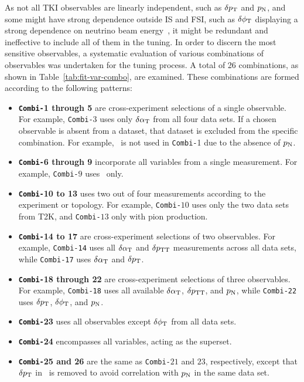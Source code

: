     As not all TKI observables are linearly independent, such as $\delta p_\textrm{T}$ and $p_\textrm{N}$, and some might have strong dependence outside IS and FSI, such as $\delta\phi_\textrm{T}$ displaying a strong dependence on neutrino beam energy~\cite{Lu:2015tcr}, it might be redundant and ineffective to include all of them in the tuning.
    In order to discern the most sensitive observables, a systematic evaluation of various combinations of observables was undertaken for the tuning process. 
    A total of 26 combinations, as shown in Table~\ref{tab:fit-var-combo}, are examined. 
    These combinations are formed according to the following patterns:
    \begin{itemize}
        \item \textbf{\texttt{Combi-}1 through 5} are cross-experiment selections of a single observable. 
        For example, \texttt{Combi-}$3$ uses only $\delta\alpha_\textrm{T}$ from all four data sets. 
        If a chosen observable is absent from a dataset, that dataset is excluded from the specific combination. 
        For example, \ttkzpi\ is not used in \texttt{Combi-}1 due to the absence of $p_\textrm{N}$.
        \item \textbf{\texttt{Combi-}6 through 9} incorporate all variables from a single measurement. For example, \texttt{Combi-}$9$ uses \minpiz\ only.
        \item \textbf{\texttt{Combi-}10 to 13} uses two out of four measurements according to the experiment or topology. For example, \texttt{Combi-}$10$ uses only the two data sets from T2K, and \texttt{Combi-}$13$  only with pion production. 
        \item \textbf{\texttt{Combi-}14 to 17} are cross-experiment selections of two observables. 
        For example, \texttt{Combi-14} uses all $\delta\alpha_\textrm{T}$ and $\delta p_\textrm{TT}$ measurements across all data sets, while \texttt{Combi-17} uses $\delta\alpha_\textrm{T}$ and $\delta p_\textrm{T}$.
        \item \textbf{\texttt{Combi-}18 through 22} are cross-experiment selections of three observables. 
        For example, \texttt{Combi-18} uses all available $\delta\alpha_\textrm{T}$, $\delta p_\textrm{TT}$, and $p_\textrm{N}$, while \texttt{Combi-22} uses $\delta p_\textrm{T}$, $\delta\phi_\textrm{T}$, and $p_\textrm{N}$.
        \item \textbf{\texttt{Combi-}23} uses all observables except $\delta\phi_\textrm{T}$ from all data sets.
        \item \textbf{\texttt{Combi-}24} encompasses all variables, acting as the superset.
        \item \textbf{\texttt{Combi-}25 and 26} are the same as \texttt{Combi-}$21$ and $23$, respectively, except that $\delta p_\textrm{T}$ in \minzpi\ is removed to avoid correlation with $p_\textrm{N}$ in the same data set.
    \end{itemize}

